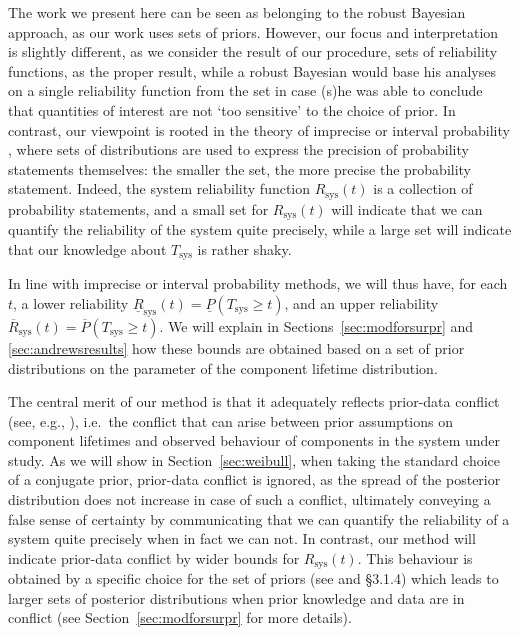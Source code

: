 \documentclass[12pt,a4paper,twocolumn,fleqn]{narms}
\newcommand{\ul}[1]{\underline{#1}}
\newcommand{\ol}[1]{\overline{#1}}
\newcommand{\lRsys}{\ul{R}_\text{sys}}
\newcommand{\uRsys}{\ol{R}_\text{sys}}
\newcommand{\comments}[1]{{\small\color{gray} #1}}
\begin{document}
The work we present here can be seen as belonging to the robust Bayesian approach,
as our work uses sets of priors. However, our focus and interpretation is slightly different,
as we consider the result of our procedure, sets of reliability functions, as the proper result,
while a robust Bayesian would base his analyses on a single reliability function from the set
in case (s)he was able to conclude that quantities of interest are not `too sensitive' to the choice of prior.
In contrast, our viewpoint is rooted in the theory of imprecise or interval probability \cite{1991:walley,itip},
where sets of distributions are used to express the precision of probability statements themselves:
the smaller the set, the more precise the probability statement.
Indeed, the system reliability function $R_\text{sys}(t)$ is a collection of probability statements,
and a small set for $R_\text{sys}(t)$ will indicate that we can quantify the reliability of the system quite precisely,
while a large set will indicate that our knowledge about $T_\text{sys}$ is rather shaky.

In line with imprecise or interval probability methods, we will thus have, for each $t$,
a lower reliability $\lRsys(t) = \ul{P}(T_\text{sys} \geq t)$,
and an upper reliability $\uRsys(t) = \ol{P}(T_\text{sys} \geq t)$.
We will explain in Sections~\ref{sec:modforsurpr} and \ref{sec:andrewsresults} how these bounds are obtained
based on a set of prior distributions on the parameter of the component lifetime distribution.

The central merit of our method is that it adequately reflects prior-data conflict
(see, e.g., ),
i.e.\ the conflict that can arise between prior assumptions on component lifetimes
and observed behaviour of components in the system under study.
As we will show in Section~\ref{sec:weibull}, when taking the standard choice of a conjugate prior,
prior-data conflict is ignored, as the spread of the posterior distribution does not increase in case of such a conflict,
ultimately conveying a false sense of certainty
by communicating that we can quantify the reliability of a system quite precisely when in fact we can not.
%
In contrast, our method will indicate prior-data conflict by wider bounds for $R_\text{sys}(t)$.
This behaviour is obtained by a specific choice for the set of priors (see  and  \S 3.1.4)
which leads to larger sets of posterior distributions when prior knowledge and data are in conflict
(see Section~\ref{sec:modforsurpr} for more details).
\end{document}
